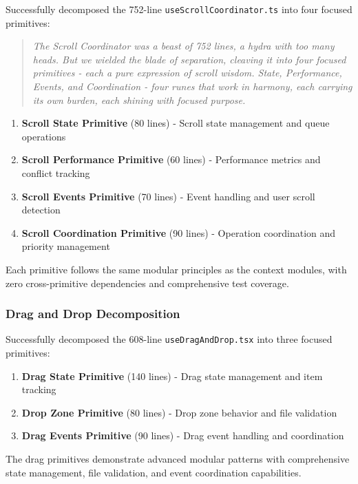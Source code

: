 \documentclass[11pt]{article}
\begin{document}
Successfully decomposed the 752-line \texttt{useScrollCoordinator.ts} into four focused primitives:

\begin{quote}
\emph{The Scroll Coordinator was a beast of 752 lines, a hydra with too many heads. But we wielded the blade of separation, cleaving it into four focused primitives - each a pure expression of scroll wisdom. State, Performance, Events, and Coordination - four runes that work in harmony, each carrying its own burden, each shining with focused purpose.}
\end{quote}

\begin{enumerate}
\item \textbf{Scroll State Primitive} (80 lines) - Scroll state management and queue operations
\item \textbf{Scroll Performance Primitive} (60 lines) - Performance metrics and conflict tracking
\item \textbf{Scroll Events Primitive} (70 lines) - Event handling and user scroll detection
\item \textbf{Scroll Coordination Primitive} (90 lines) - Operation coordination and priority management
\end{enumerate}

Each primitive follows the same modular principles as the context modules, with zero cross-primitive dependencies and comprehensive test coverage.

\subsubsection{Drag and Drop Decomposition}

Successfully decomposed the 608-line \texttt{useDragAndDrop.tsx} into three focused primitives:

\begin{enumerate}
\item \textbf{Drag State Primitive} (140 lines) - Drag state management and item tracking
\item \textbf{Drop Zone Primitive} (80 lines) - Drop zone behavior and file validation
\item \textbf{Drag Events Primitive} (90 lines) - Drag event handling and coordination
\end{enumerate}

The drag primitives demonstrate advanced modular patterns with comprehensive state management, file validation, and event coordination capabilities.
\end{document}
